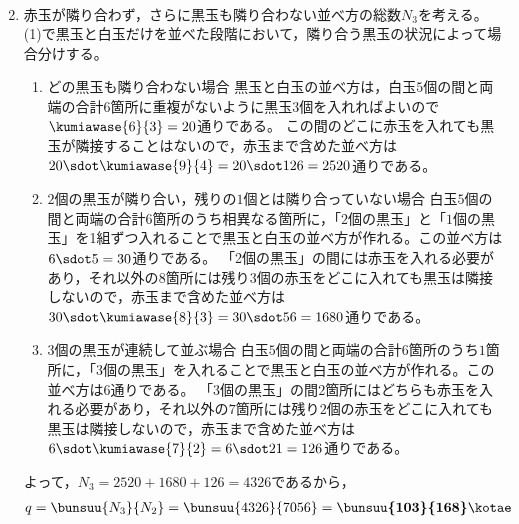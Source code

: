 \documentclass[../../../doc/main]{subfiles}
\begin{document}
\begin{enumerate}
\begin{align*}
            \end{align*}
        \item [\kakkoni]
            赤玉が隣り合わず，さらに黒玉も隣り合わない並べ方の総数$ N_3 $を考える。(1)で黒玉と白玉だけを並べた段階において，隣り合う黒玉の状況によって場合分けする。
            \begin{enumerate}
                \item [\tokeiichi]
                    どの黒玉も隣り合わない場合
                    黒玉と白玉の並べ方は，白玉$ 5 $個の間と両端の合計$ 6 $箇所に重複がないように黒玉$ 3 $個を入れればよいので$ \kumiawase{6}{3} = 20 $通りである。
                    この間のどこに赤玉を入れても黒玉が隣接することはないので，赤玉まで含めた並べ方は$ 20 \sdot \kumiawase{9}{4} = 20 \sdot 126 = 2520 $通りである。
                \item [\tokeini]
                    $ 2 $個の黒玉が隣り合い，残りの$ 1 $個とは隣り合っていない場合
                    白玉$ 5 $個の間と両端の合計$ 6 $箇所のうち相異なる箇所に，「$ 2 $個の黒玉」と「$ 1 $個の黒玉」を1組ずつ入れることで黒玉と白玉の並べ方が作れる。この並べ方は$ 6 \sdot 5 = 30 $通りである。
                    「2個の黒玉」の間には赤玉を入れる必要があり，それ以外の$ 8 $箇所には残り$ 3 $個の赤玉をどこに入れても黒玉は隣接しないので，赤玉まで含めた並べ方は$ 30 \sdot \kumiawase{8}{3} = 30 \sdot 56 = 1680 $通りである。
                \item [\tokeisan]
                    $ 3 $個の黒玉が連続して並ぶ場合
                    白玉$ 5 $個の間と両端の合計$ 6 $箇所のうち$ 1 $箇所に，「3個の黒玉」を入れることで黒玉と白玉の並べ方が作れる。この並べ方は$ 6 $通りである。
                    「3個の黒玉」の間$ 2 $箇所にはどちらも赤玉を入れる必要があり，それ以外の$ 7 $箇所には残り$ 2 $個の赤玉をどこに入れても黒玉は隣接しないので，赤玉まで含めた並べ方は$ 6 \sdot \kumiawase{7}{2} = 6 \sdot 21 = 126 $通りである。
            \end{enumerate}
        よって，$ N_3 = 2520 + 1680 + 126 = 4326 $であるから，
        \begin{align*}
            q = \bunsuu{N_3}{N_2} = \bunsuu{4326}{7056} = \boldsymbol{\bunsuu{103}{168}} \kotae
        \end{align*}
    \end{enumerate}
\end{document}
